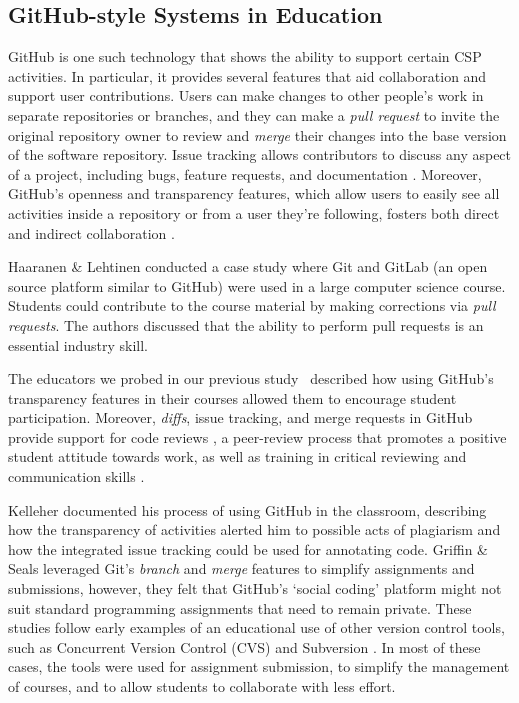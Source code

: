 \subsection{GitHub-style Systems in Education}
GitHub is one such technology that shows the ability to support certain CSP activities. In particular, it provides several features that aid collaboration and support user contributions. Users can make changes to other people's work in separate repositories or branches, and they can make a \emph{pull request} to invite the original repository owner to review and \emph{merge} their changes into the base version of the software repository. Issue tracking allows contributors to discuss any aspect of a project, including bugs, feature requests, and documentation \cite{bissyande2013got}. Moreover, GitHub's openness and transparency features, which allow users to easily see all activities inside a repository or from a user they're following, fosters both direct and indirect collaboration \cite{dabbish2012social}.

Haaranen \& Lehtinen \cite{haaranen2015teaching} conducted a case study where Git and GitLab (an open source platform similar to GitHub) were used in a large computer science course. Students could contribute to the course material by making corrections via \emph{pull requests}. The authors discussed that the ability to perform pull requests is an essential industry skill.

The educators we probed in our previous study~\cite{zagalsky2015emergence} described how using GitHub's transparency features in their courses allowed them to encourage student participation. Moreover, \emph{diffs}, issue tracking, and merge requests in GitHub provide support for code reviews \cite{kalliamvakou2014promises}, a peer-review process that promotes a positive student attitude towards work, as well as training in critical reviewing and communication skills \cite{hundhausen2013talking}.

Kelleher \cite{kelleher2014employing} documented his process of using GitHub in the classroom, describing how the transparency of activities alerted him to possible acts of plagiarism and how the integrated issue tracking could be used for annotating code. Griffin \& Seals \cite{griffin2013github} leveraged Git's \emph{branch} and \emph{merge} features to simplify assignments and submissions, however, they felt that GitHub's `social coding' platform might not suit standard programming assignments that need to remain private. These studies follow early examples of an educational use of other version control tools, such as Concurrent Version Control (CVS) \cite{reid2005learning} and Subversion \cite{clifton2007subverting}. In most of these cases, the tools were used for assignment submission, to simplify the management of courses, and to allow students to collaborate with less effort.
